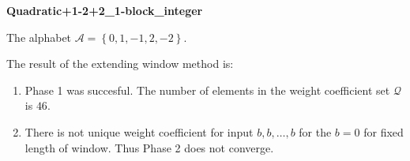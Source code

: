 \begin{exmp}
\textbf{ Quadratic+1-2+2\_1-block\_integer }

\label{ex:Quadratic+1-2+21-blockinteger}

The alphabet $\mathcal{A} =\left\{0, 1, -1, 2, -2\right\}$.

The result of the extending window method is:
\begin{enumerate}
    \item Phase 1 was succesful.
The number of elements in the weight coefficient set $\mathcal{Q}$ is $46$.

    \item There is not unique weight coefficient for input $b,b,\dots,b$ for the $b= 0 $ for fixed length of window. Thus Phase 2 does not converge.

\end{enumerate}
\end{exmp}
